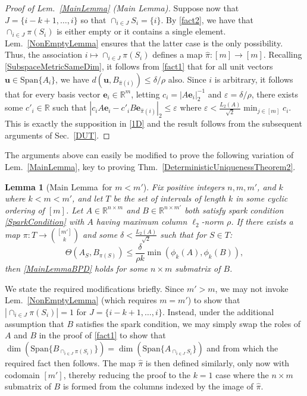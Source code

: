 \documentclass[journal, twocolumn]{IEEEtran}
\newtheorem{lemma}{Lemma}
\begin{document}
\begin{proof}[Proof of Lem.~\ref{MainLemma} (Main Lemma)]
Suppose now that $J = \{i-k+1, \ldots, i\}$ so that \mbox{$\cap_{i \in J} S_i = \{i\}$}. By \eqref{fact2}, we have that $\cap_{i \in J} \pi(S_i)$ is either empty or it contains a single element. Lem.~\ref{NonEmptyLemma} ensures that the latter case is the only possibility. Thus, the association $i \mapsto \cap_{i \in J} \pi(S_i)$ defines a map $\hat \pi: [m] \to [m]$. Recalling \eqref{SubspaceMetricSameDim}, it follows from \eqref{fact1} that for all unit vectors $\mathbf{u} \in \text{Span}\{A_i\}$, we have $d\left( \mathbf{u}, B_{\hat \pi(i)}\right) \leq \delta/\rho$ also. Since $i$ is arbitrary, it follows that for every basis vector $\mathbf{e}_i \in \mathbb{R}^m$, letting $c_i = |A\mathbf{e}_i|_2^{-1}$ and $\varepsilon = \delta/\rho$, there exists some $c'_i \in \mathbb{R}$ such that $|c_iA\mathbf{e}_i - c'_iB\mathbf{e}_{\hat \pi(i)}|_2 \leq \varepsilon$ where $\varepsilon < \frac{L_2(A)}{\sqrt{2}} \min_{j \in [m]} c_i$. This is exactly the supposition in \eqref{1D} and the result follows from the subsequent arguments of Sec.~\ref{DUT}. 
\end{proof}

The arguments above can easily be modified to prove the following variation of Lem.~\ref{MainLemma}, key to proving Thm.~\ref{DeterministicUniquenessTheorem2}.

\begin{lemma}[Main Lemma~for $m < m'$]\label{MainLemma2}
Fix positive integers $n, m, m'$, and $k$ where $k < m < m'$, and let $T$ be the set of intervals of length $k$ in some cyclic ordering of $[m]$. Let $A \in \mathbb{R}^{n \times m}$ and $B \in \mathbb{R}^{n \times m'}$ both satisfy spark condition \eqref{SparkCondition} with $A$ having maximum column $\ell_2$-norm $\rho$. If there exists a map $\pi: T \to {[m'] \choose k}$ and some $\delta < \frac{L_{2}(A)}{\sqrt{2}}$ such that for $S \in T$:
\begin{equation}\label{GapUpperBound2}
\Theta(A_{S}, B_{\pi(S)}) \leq \frac{ \delta }{\rho k} \min(\phi_k(A), \phi_k(B)),
\end{equation}
then \eqref{MainLemmaBPD} holds for some $n \times m$ submatrix of $B$. 
\end{lemma}

We state the required modifications briefly. Since $m' > m$, we may not invoke Lem.~\ref{NonEmptyLemma} (which requires $m = m'$) to show that $|\cap_{i \in J} \pi(S_i)| = 1$ for $J = \{i-k+1, \ldots, i\}$. Instead, under the additional assumption that $B$ satisfies the spark condition, we may simply swap the roles of $A$ and $B$ in the proof of \eqref{fact1} to show that $\dim(\text{Span}\{B_{\cap_{i \in J}\pi(S_i)}\}) = \dim(\text{Span}\{A_{\cap_{i \in J} S_i}\})$ and from which the required fact then follows. The map $\hat \pi$ is then defined similarly, only now with codomain $[m']$, thereby reducing the proof to the $k=1$ case where the $n \times m$ submatrix of $B$ is formed from the columns indexed by the image of $\hat \pi$. 
\end{document}
